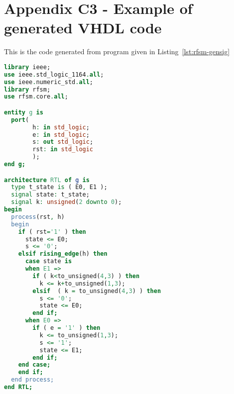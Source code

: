 \chapter*{Appendix C3 - Example of generated VHDL code}  
\label{cha:ex1-vhdl}

This is the code generated from program given in Listing~\ref{lst:rfsm-gensig} 

\begin{lstlisting}[language=VHDL,frame=single,numbers=none,basicstyle=\small,caption=File g.vhd]
library ieee;
use ieee.std_logic_1164.all;
use ieee.numeric_std.all;
library rfsm;
use rfsm.core.all;

entity g is
  port(
        h: in std_logic;
        e: in std_logic;
        s: out std_logic;
        rst: in std_logic
        );
end g;

architecture RTL of g is
  type t_state is ( E0, E1 );
  signal state: t_state;
  signal k: unsigned(2 downto 0);
begin
  process(rst, h)
  begin
    if ( rst='1' ) then
      state <= E0;
      s <= '0';
    elsif rising_edge(h) then 
      case state is
      when E1 =>
        if ( k<to_unsigned(4,3) ) then
          k <= k+to_unsigned(1,3);
        elsif  ( k = to_unsigned(4,3) ) then
          s <= '0';
          state <= E0;
        end if;
      when E0 =>
        if ( e = '1' ) then
          k <= to_unsigned(1,3);
          s <= '1';
          state <= E1;
        end if;
    end case;
    end if;
  end process;
end RTL;
\end{lstlisting}

